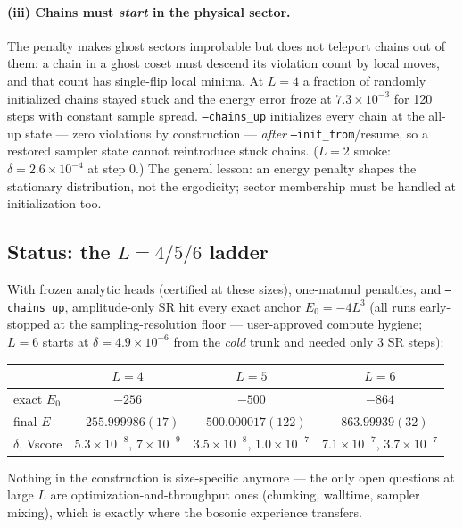 \documentclass[11pt]{article}
\begin{document}
\paragraph{(iii) Chains must \emph{start} in the physical sector.}
The penalty makes ghost sectors improbable but does not teleport chains out
of them: a chain in a ghost coset must descend its violation count by local
moves, and that count has single-flip local minima. At $L=4$ a fraction of
randomly initialized chains stayed stuck and the energy error froze at
$7.3\times10^{-3}$ for 120 steps with constant sample spread.
\texttt{--chains\_up} initializes every chain at the all-up state --- zero
violations by construction --- \emph{after} \texttt{--init\_from}/resume, so a
restored sampler state cannot reintroduce stuck chains. ($L=2$ smoke:
$\delta=2.6\times10^{-4}$ at step 0.) The general lesson: an energy penalty
shapes the stationary distribution, not the ergodicity; sector membership
must be handled at initialization too.

\subsection{Status: the $L=4/5/6$ ladder}
\label{sec:status}

With frozen analytic heads (certified at these sizes), one-matmul penalties,
and \texttt{--chains\_up}, amplitude-only SR hit every exact anchor
$E_0=-4L^3$ (all runs early-stopped at the sampling-resolution floor —
user-approved compute hygiene; $L{=}6$ starts at $\delta=4.9\times10^{-6}$
from the \emph{cold} trunk and needed only 3 SR steps):

\begin{center}
\begin{tabular}{@{}lccc@{}}
\toprule
& $L=4$ & $L=5$ & $L=6$\\
\midrule
exact $E_0$ & $-256$ & $-500$ & $-864$\\
final $E$ & $-255.999986(17)$ & $-500.000017(122)$ & $-863.99939(32)$\\
$\delta$, Vscore & $5.3{\times}10^{-8}$, $7{\times}10^{-9}$
  & $3.5{\times}10^{-8}$, $1.0{\times}10^{-7}$
  & $7.1{\times}10^{-7}$, $3.7{\times}10^{-7}$\\
\bottomrule
\end{tabular}
\end{center}

\noindent
Nothing in the construction is size-specific anymore --- the only open
questions at large $L$ are optimization-and-throughput ones (chunking,
walltime, sampler mixing), which is exactly where the bosonic experience
transfers.
\end{document}
